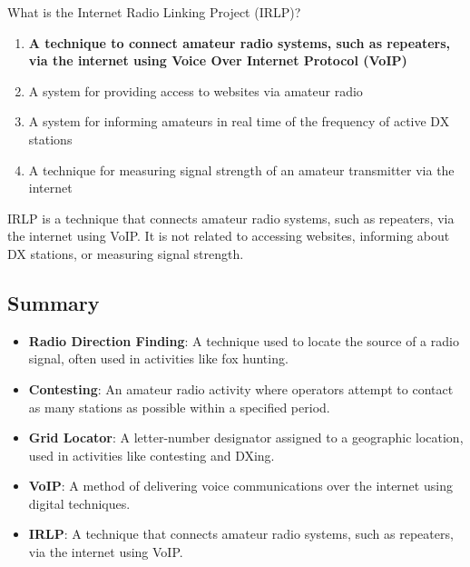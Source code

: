 
\begin{tcolorbox}[colback=gray!10!white,colframe=black!75!black,title={T8C08}]
    What is the Internet Radio Linking Project (IRLP)?
    \begin{enumerate}[label=\Alph*,noitemsep]
        \item \textbf{A technique to connect amateur radio systems, such as repeaters, via the internet using Voice Over Internet Protocol (VoIP)}
        \item A system for providing access to websites via amateur radio
        \item A system for informing amateurs in real time of the frequency of active DX stations
        \item A technique for measuring signal strength of an amateur transmitter via the internet
    \end{enumerate}
\end{tcolorbox}
IRLP is a technique that connects amateur radio systems, such as repeaters, via the internet using VoIP. It is not related to accessing websites, informing about DX stations, or measuring signal strength.


\subsection*{Summary}
\begin{itemize}
    \item \textbf{Radio Direction Finding}: A technique used to locate the source of a radio signal, often used in activities like fox hunting.
    \item \textbf{Contesting}: An amateur radio activity where operators attempt to contact as many stations as possible within a specified period.
    \item \textbf{Grid Locator}: A letter-number designator assigned to a geographic location, used in activities like contesting and DXing.
    \item \textbf{VoIP}: A method of delivering voice communications over the internet using digital techniques.
    \item \textbf{IRLP}: A technique that connects amateur radio systems, such as repeaters, via the internet using VoIP.
\end{itemize}
